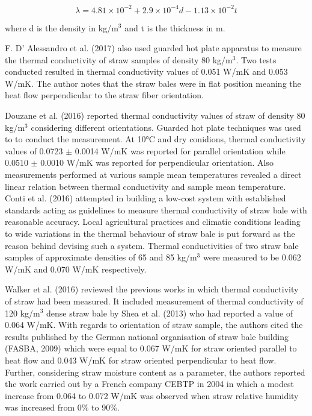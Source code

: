 \documentclass[]{article}
\begin{document}
\[\lambda = 4.81 \times 10^{-2} + 2.9 \times 10^{-4} d   -1.13 \times 10^{-2} t\]

where d is the density in kg/m\(^{3}\) and t is the thickness in m.

 F. D' Alessandro et al. (2017) also used guarded hot plate apparatus to
measure the thermal conductivity of straw samples of density 80
kg/m\(^{3}\). Two tests conducted resulted in thermal conductivity
values of 0.051 W/mK and 0.053 W/mK. The author notes that the straw
bales were in flat position meaning the heat flow perpendicular to the
straw fiber orientation.

 Douzane et al. (2016) reported thermal conductivity values of straw of
density 80 kg/m\(^{3}\) considering different orientations. Guarded hot
plate techniques was used to to conduct the measurement. At 10°C and dry
conidions, thermal conductivity values of 0.0723 \(\pm\) 0.0014 W/mK was
reported for parallel orientation while 0.0510 \(\pm\) 0.0010 W/mK was
reported for perpendicular orientation. Also measurements performed at
various sample mean temperatures revealed a direct linear relation
between thermal conductivity and sample mean temperature. \\

 Conti et al. (2016) attempted in building a low-cost system with
established standards acting as guidelines to measure thermal
conductivity of straw bale with reasonable accuracy. Local agricultural
practices and climatic conditions leading to wide variations in the
thermal behaviour of straw bale is put forward as the reason behind
devising such a system. Thermal conductivities of two straw bale samples
of approximate densities of 65 and 85 kg/m\(^{3}\) were measured to be
0.062 W/mK and 0.070 W/mK respectively.

 Walker et al. (2016) reviewed the previous works in which thermal
conductivity of straw had been measured. It included measurement of
thermal conductivity of 120 kg/m\(^{3}\) dense straw bale by Shea et al.
(2013) who had reported a value of 0.064 W/mK. With regards to
orientation of straw sample, the authors cited the results published by
the German national organisation of straw bale building (FASBA, 2009)
which were equal to 0.067 W/mK for straw oriented parallel to heat flow
and 0.043 W/mK for straw oriented perpendicular to heat flow. Further,
considering straw moisture content as a parameter, the authors reported
the work carried out by a French company CEBTP in 2004 in which a modest
increase from 0.064 to 0.072 W/mK was observed when straw relative
humidity was increased from 0\% to 90\%.\\
\end{document}

